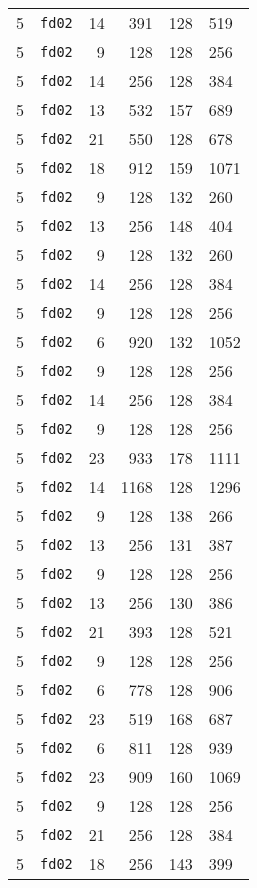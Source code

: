 \documentclass{article}
\begin{document}
\begin{table}[h!]
\begin{tabular}{llrrrl}
    5 & \texttt{fd02} & 14 & 391 & 128 & 519 \\
    5 & \texttt{fd02} & 9 & 128 & 128 & 256 \\
    5 & \texttt{fd02} & 14 & 256 & 128 & 384 \\
    5 & \texttt{fd02} & 13 & 532 & 157 & 689 \\
    5 & \texttt{fd02} & 21 & 550 & 128 & 678 \\
    5 & \texttt{fd02} & 18 & 912 & 159 & 1071 \\
    5 & \texttt{fd02} & 9 & 128 & 132 & 260 \\
    5 & \texttt{fd02} & 13 & 256 & 148 & 404 \\
    5 & \texttt{fd02} & 9 & 128 & 132 & 260 \\
    5 & \texttt{fd02} & 14 & 256 & 128 & 384 \\
    5 & \texttt{fd02} & 9 & 128 & 128 & 256 \\
    5 & \texttt{fd02} & 6 & 920 & 132 & 1052 \\
    5 & \texttt{fd02} & 9 & 128 & 128 & 256 \\
    5 & \texttt{fd02} & 14 & 256 & 128 & 384 \\
    5 & \texttt{fd02} & 9 & 128 & 128 & 256 \\
    5 & \texttt{fd02} & 23 & 933 & 178 & 1111 \\
    5 & \texttt{fd02} & 14 & 1168 & 128 & 1296 \\
    5 & \texttt{fd02} & 9 & 128 & 138 & 266 \\
    5 & \texttt{fd02} & 13 & 256 & 131 & 387 \\
    5 & \texttt{fd02} & 9 & 128 & 128 & 256 \\
    5 & \texttt{fd02} & 13 & 256 & 130 & 386 \\
    5 & \texttt{fd02} & 21 & 393 & 128 & 521 \\
    5 & \texttt{fd02} & 9 & 128 & 128 & 256 \\
    5 & \texttt{fd02} & 6 & 778 & 128 & 906 \\
    5 & \texttt{fd02} & 23 & 519 & 168 & 687 \\
    5 & \texttt{fd02} & 6 & 811 & 128 & 939 \\
    5 & \texttt{fd02} & 23 & 909 & 160 & 1069 \\
    5 & \texttt{fd02} & 9 & 128 & 128 & 256 \\
    5 & \texttt{fd02} & 21 & 256 & 128 & 384 \\
    5 & \texttt{fd02} & 18 & 256 & 143 & 399 \\

\end{tabular}
\end{table}
\end{document}
